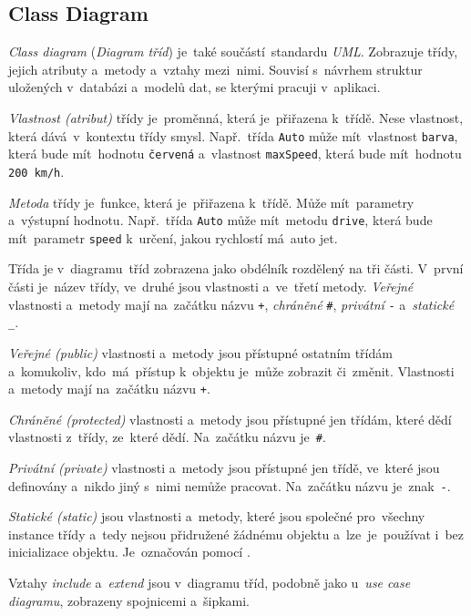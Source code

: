 \documentclass[11pt,a4paper]{report}
\begin{document}
            \subsection{Class Diagram}
                \emph{Class diagram} (\emph{Diagram tříd}) je~také součástí~standardu \emph{UML}. Zobrazuje třídy, jejich atributy a~metody a~vztahy mezi~nimi. Souvisí s~návrhem struktur uložených v~databázi a~modelů dat, se kterými pracuji v~aplikaci.

                \emph{Vlastnost (atribut)} třídy je~proměnná, která je~přiřazena k~třídě. Nese vlastnost, která dává~v~kontextu třídy smysl. Např.~třída \texttt{Auto} může mít~vlastnost \texttt{barva}, která bude mít~hodnotu \texttt{červená} a~vlastnost \texttt{maxSpeed}, která bude mít~hodnotu \texttt{200 km/h}.

                \emph{Metoda} třídy je~funkce, která je~přiřazena k~třídě. Může mít~parametry a~výstupní hodnotu. Např.~třída \texttt{Auto} může mít~metodu \texttt{drive}, která bude mít~parametr \texttt{speed} k~určení, jakou rychlostí má~auto jet.
                
                Třída je v~diagramu~tříd zobrazena jako obdélník rozdělený na tři části. V~první části je~název třídy, ve~druhé jsou vlastnosti a~ve~třetí metody. \emph{Veřejné} vlastnosti a~metody mají na~začátku názvu \texttt{+}, \emph{chráněné} \texttt{\#}, \emph{privátní} \texttt{-} a~\emph{statické} \texttt{\_}.
                
                \emph{Veřejné (public)} vlastnosti a~metody jsou přístupné ostatním třídám a~komukoliv, kdo~má~přístup k~objektu je~může zobrazit či~změnit. Vlastnosti a~metody mají na~začátku názvu \texttt{+}.

                \emph{Chráněné (protected)} vlastnosti a~metody jsou přístupné jen třídám, které dědí vlastnosti z~třídy, ze~které dědí. Na~začátku názvu je~\texttt{\#}.
                
                \emph{Privátní (private)} vlastnosti a~metody jsou přístupné jen třídě, ve~které jsou definovány a~nikdo jiný s~nimi nemůže pracovat. Na~začátku názvu je~znak~\texttt{-}.
                
                \emph{Statické (static)} jsou vlastnosti a~metody, které jsou společné pro~všechny instance třídy a~tedy nejsou přidružené žádnému objektu a~lze~je~používat i~bez inicializace objektu. Je~označován pomocí \texttt{\textunderscore}.
                
                Vztahy \emph{include} a~\emph{extend} jsou v~diagramu tříd, podobně jako u~\emph{use case diagramu}, zobrazeny spojnicemi a~šipkami.
\end{document}
